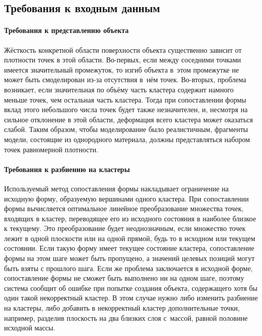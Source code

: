 \documentclass[a4paper, 14pt, titlepage]{extarticle}
\begin{document}
    \subsection{Требования к входным данным}\label{ssec:requirements}

      \paragraph{Требования к представлению объекта}
      Жёсткость конкретной области поверхности объекта существенно зависит от плотности точек в этой
      области. Во-первых, если между соседними точками имеется значительный промежуток, то изгиб
      объекта в~этом промежутке не может быть смоделирован из-за отсутствия в~нём точек. Во-вторых,
      проблема возникает, если значительная по объёму часть кластера содержит намного меньше точек,
      чем остальная часть кластера. Тогда при сопоставлении формы вклад этого небольшого числа точек будет
      также незначителен, и, несмотря на сильное отклонение в этой области, деформация всего
      кластера может оказаться слабой. Таким образом, чтобы моделирование было реалистичным,
      фрагменты модели, состоящие из однородного материала, должны представляться набором точек
      равномерной плотности.

      \paragraph{Требования к разбиению на кластеры}
      Используемый метод сопоставления формы накладывает ограничение на исходную форму, образуемую
      вершинами одного кластера. При сопоставлении формы вычисляется оптимальное линейное преобразование
      множества точек, входящих в кластер, переводящее его из исходного состояния в наиболее близкое
      к текущему. Это преобразование будет неоднозначным, если множество точек лежит в одной
      плоскости или на одной прямой, будь то в исходном или текущем состоянии. Если такую форму
      имеет текущее состояние кластера, сопоставление формы на этом шаге может быть пропущено, а значений
      целевых позиций могут быть взяты с прошлого шага. Если же проблема заключается в
      исходной форме, сопоставление формы не сможет быть выполнено ни на одном шаге, поэтому система сообщит
      об ошибке при попытке создания объекта, содержащего хотя бы один такой некорректный кластер.
      В этом случае нужно либо изменить разбиение на кластеры, либо добавить в некорректный кластер
      дополнительные точки, например, разделив плоскость на два близких слоя с~массой, равной
      половине исходной массы.
\end{document}
